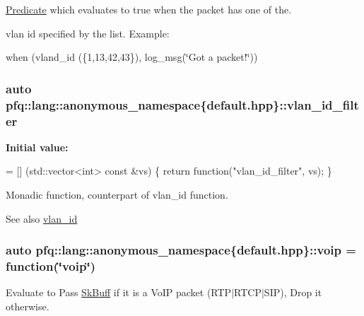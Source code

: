 \hyperlink{structpfq_1_1lang_1_1Predicate}{Predicate} which evaluates to {\ttfamily true} when the packet has one of the. 

vlan id specified by the list. Example\+:

when (vland\+\_\+id (\{1,13,42,43\}), log\+\_\+msg(\char`\"{}\+Got a packet!\char`\"{})) 
\subsubsection[{\texorpdfstring{vlan\+\_\+id\+\_\+filter}{vlan_id_filter}}]{\setlength{\rightskip}{0pt plus 5cm}auto pfq\+::lang\+::anonymous\+\_\+namespace\{default.\+hpp\}\+::vlan\+\_\+id\+\_\+filter}\hypertarget{namespacepfq_1_1lang_1_1anonymous__namespace_02default_8hpp_03_ab843ad210e98a7c8a4218efaf60f8c01}{}\label{namespacepfq_1_1lang_1_1anonymous__namespace_02default_8hpp_03_ab843ad210e98a7c8a4218efaf60f8c01}
{\bfseries Initial value\+:}
\begin{DoxyCode}
= [] (std::vector<int> \textcolor{keyword}{const} &vs) \{
                                    \textcolor{keywordflow}{return} \textcolor{keyword}{function}(\textcolor{stringliteral}{"vlan\_id\_filter"}, vs);
                              \}
\end{DoxyCode}


Monadic function, counterpart of {\ttfamily vlan\+\_\+id} function. 

\begin{DoxySeeAlso}{See also}
\hyperlink{namespacepfq_1_1lang_1_1anonymous__namespace_02default_8hpp_03_ad2a631020f34bf10335ebb0e79f03920}{vlan\+\_\+id} 
\end{DoxySeeAlso}
\subsubsection[{\texorpdfstring{voip}{voip}}]{\setlength{\rightskip}{0pt plus 5cm}auto pfq\+::lang\+::anonymous\+\_\+namespace\{default.\+hpp\}\+::voip = {\bf function}(\char`\"{}voip\char`\"{})}\hypertarget{namespacepfq_1_1lang_1_1anonymous__namespace_02default_8hpp_03_a814df3093ef905eedf9a9add4c625147}{}\label{namespacepfq_1_1lang_1_1anonymous__namespace_02default_8hpp_03_a814df3093ef905eedf9a9add4c625147}


Evaluate to {\ttfamily Pass} \hyperlink{structpfq_1_1lang_1_1SkBuff}{Sk\+Buff} if it is a Vo\+IP packet (R\+T\+P$\vert$\+R\+T\+C\+P$\vert$\+S\+IP), {\ttfamily Drop} it otherwise. 

